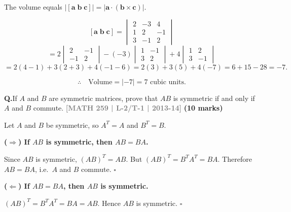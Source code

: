\documentclass[12pt,a3paper]{article}
\newcommand{\yr}[1]{\hfill\textcolor{gray}{\small\textbf{[#1]}}}
\newcommand{\mk}[1]{\textcolor{orange!70!black}{\small\textbf{(#1 marks)}}}
\newcounter{qnum}
\newcommand{\Q}[1]{%
  \needspace{4\baselineskip}
  \refstepcounter{qnum}
  \vspace{6pt}
  \noindent\textbf{Q\theqnum.}\enspace #1\par
}
\begin{document}
\begin{tcolorbox}[enhanced,breakable,
  colback=cA!4,colframe=cA,boxrule=0.8pt,arc=5pt,
  title={\textbf{Answer --- Volume of Parallelepiped with $\mathbf{a}=2\hat{i}-3\hat{j}+4\hat{k}$, etc.}},
  fonttitle=\bfseries\color{white},colbacktitle=cA]
 
The volume equals $|[\mathbf{a}\;\mathbf{b}\;\mathbf{c}]| = |\mathbf{a}\cdot(\mathbf{b}\times\mathbf{c})|$.
 
\[
[\mathbf{a}\;\mathbf{b}\;\mathbf{c}] = \begin{vmatrix}2&-3&4\\1&2&-1\\3&-1&2\end{vmatrix}
\]
\[
= 2\begin{vmatrix}2&-1\\-1&2\end{vmatrix}
-(-3)\begin{vmatrix}1&-1\\3&2\end{vmatrix}
+4\begin{vmatrix}1&2\\3&-1\end{vmatrix}
\]
\[
= 2(4-1) + 3(2+3) + 4(-1-6)
= 2(3) + 3(5) + 4(-7)
= 6 + 15 - 28 = -7.
\]
 
\[
\therefore\quad \text{Volume} = |{-7}| = \boxed{7 \text{ cubic units}}.
\]
 
\end{tcolorbox}
 

\Q{If $A$ and $B$ are symmetric matrices, prove that $AB$ is symmetric if and only if $A$ and $B$ commute.
\yr{MATH 259 | L-2/T-1 | 2013-14} \mk{10}}

\begin{tcolorbox}[enhanced,breakable,
  colback=cA!4,colframe=cA,boxrule=0.8pt,arc=5pt,
  title={\textbf{Answer --- $AB$ Symmetric $\iff$ $A$ and $B$ Commute}},
  fonttitle=\bfseries\color{white},colbacktitle=cA]
 
Let $A$ and $B$ be symmetric, so $A^T = A$ and $B^T = B$.
 
\medskip
\textbf{($\Rightarrow$) If $AB$ is symmetric, then $AB = BA$.}
 
Since $AB$ is symmetric, $(AB)^T = AB$.
But $(AB)^T = B^T A^T = BA$.
Therefore $AB = BA$, i.e.\ $A$ and $B$ commute. \hfill$\square$
 
\medskip
\textbf{($\Leftarrow$) If $AB = BA$, then $AB$ is symmetric.}
 
$(AB)^T = B^T A^T = BA = AB$.
Hence $AB$ is symmetric. \hfill$\square$
 
\end{tcolorbox}
 
\end{document}

